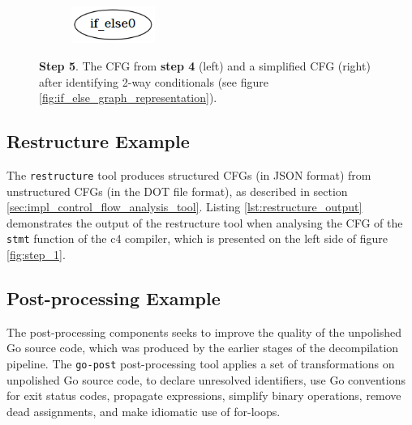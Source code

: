 \begin{figure}[htbp]
\begin{subfigure}[t]{0.45\textwidth}
	\end{subfigure}
	\qquad
	\begin{subfigure}[t]{0.45\textwidth}
		\centering
		\includegraphics[width=0.3\textwidth]{appendices/stmt_example/stmt_5.png}
	\end{subfigure}
	\caption{\textbf{Step 5}. The CFG from \textbf{step 4} (left) and a simplified CFG (right) after identifying 2-way conditionals (see figure \ref{fig:if_else_graph_representation}).}
	\label{fig:step_5}
\end{figure}

\clearpage


\subsection{Restructure Example}
\label{app:restructure_example}

The \texttt{restructure} tool produces structured CFGs (in JSON format) from unstructured CFGs (in the DOT file format), as described in section \ref{sec:impl_control_flow_analysis_tool}. Listing \ref{lst:restructure_output} demonstrates the output of the restructure tool when analysing the CFG of the \texttt{stmt} function of the c4 compiler, which is presented on the left side of figure \ref{fig:step_1}.



\clearpage


\subsection{Post-processing Example}

The post-processing components seeks to improve the quality of the unpolished Go source code, which was produced by the earlier stages of the decompilation pipeline. The \texttt{go-post} post-processing tool applies a set of transformations on unpolished Go source code, to declare unresolved identifiers, use Go conventions for exit status codes, propagate expressions, simplify binary operations, remove dead assignments, and make idiomatic use of for-loops.

